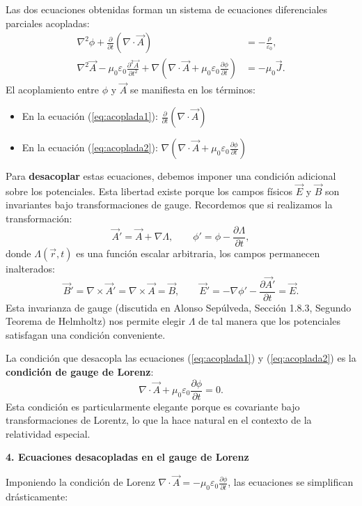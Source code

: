 \documentclass[a4paper]{article}
\begin{document}
Las dos ecuaciones obtenidas forman un sistema de ecuaciones diferenciales parciales acopladas:
\begin{align}
\nabla^2\phi + \frac{\partial}{\partial t}(\nabla \cdot \vec{A}) &= -\frac{\rho}{\varepsilon_0}, \label{eq:acoplada1} \\
\nabla^2\vec{A} - \mu_0\varepsilon_0\frac{\partial^2 \vec{A}}{\partial t^2} + \nabla\left(\nabla \cdot \vec{A} + \mu_0\varepsilon_0\frac{\partial \phi}{\partial t}\right) &= -\mu_0\vec{J}. \label{eq:acoplada2}
\end{align}
El acoplamiento entre $\phi$ y $\vec{A}$ se manifiesta en los términos:
\begin{itemize}
\item En la ecuación (\ref{eq:acoplada1}): $\frac{\partial}{\partial t}(\nabla \cdot \vec{A})$
\item En la ecuación (\ref{eq:acoplada2}): $\nabla\left(\nabla \cdot \vec{A} + \mu_0\varepsilon_0\frac{\partial \phi}{\partial t}\right)$
\end{itemize}
Para \textbf{desacoplar} estas ecuaciones, debemos imponer una condición adicional sobre los potenciales. Esta libertad existe porque los campos físicos $\vec{E}$ y $\vec{B}$ son invariantes bajo transformaciones de gauge. Recordemos que si realizamos la transformación:
$$
\vec{A}' = \vec{A} + \nabla\Lambda, \qquad \phi' = \phi - \frac{\partial \Lambda}{\partial t},
$$
donde $\Lambda(\vec{r},t)$ es una función escalar arbitraria, los campos permanecen inalterados:
$$
\vec{B}' = \nabla \times \vec{A}' = \nabla \times \vec{A} = \vec{B}, \qquad \vec{E}' = -\nabla\phi' - \frac{\partial \vec{A}'}{\partial t} = \vec{E}.
$$
Esta invarianza de gauge (discutida en Alonso Sepúlveda, Sección 1.8.3, Segundo Teorema de Helmholtz) nos permite elegir $\Lambda$ de tal manera que los potenciales satisfagan una condición conveniente.

La condición que desacopla las ecuaciones (\ref{eq:acoplada1}) y (\ref{eq:acoplada2}) es la \textbf{condición de gauge de Lorenz}:
$$
\boxed{\nabla \cdot \vec{A} + \mu_0\varepsilon_0 \frac{\partial \phi}{\partial t} = 0}.
$$
Esta condición es particularmente elegante porque es covariante bajo transformaciones de Lorentz, lo que la hace natural en el contexto de la relatividad especial.

\vspace{0.3cm}
\noindent\textbf{4. Ecuaciones desacopladas en el gauge de Lorenz}

Imponiendo la condición de Lorenz $\nabla \cdot \vec{A} = -\mu_0\varepsilon_0 \frac{\partial \phi}{\partial t}$, las ecuaciones se simplifican drásticamente:
\end{document}
